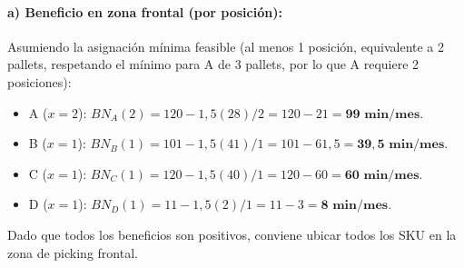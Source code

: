 \documentclass[11pt]{article}
\begin{document}
\paragraph{a) Beneficio en zona frontal (por posición):}
Asumiendo la asignación mínima feasible (al menos 1 posición, equivalente a 2 pallets, respetando el mínimo para A de 3 pallets, por lo que A requiere 2 posiciones):
\begin{itemize}
    \item A ($x=2$): $BN_A(2) = 120 - 1,5(28)/2 = 120 - 21 = \mathbf{99 \text{ min/mes}}$.
    \item B ($x=1$): $BN_B(1) = 101 - 1,5(41)/1 = 101 - 61,5 = \mathbf{39,5 \text{ min/mes}}$.
    \item C ($x=1$): $BN_C(1) = 120 - 1,5(40)/1 = 120 - 60 = \mathbf{60 \text{ min/mes}}$.
    \item D ($x=1$): $BN_D(1) = 11 - 1,5(2)/1 = 11 - 3 = \mathbf{8 \text{ min/mes}}$.
\end{itemize}
Dado que todos los beneficios son positivos, conviene ubicar todos los SKU en la zona de picking frontal.
\end{document}
